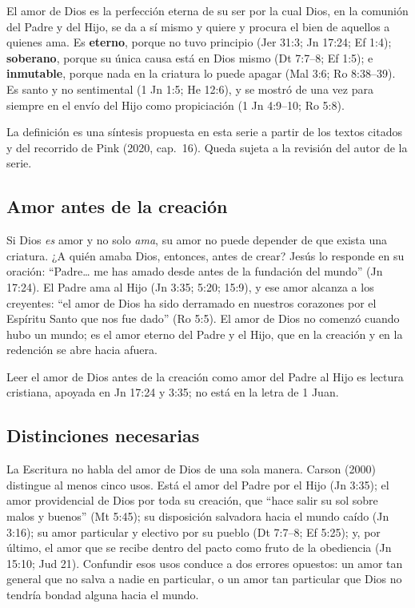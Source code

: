 \documentclass[11pt,letterpaper]{article}
\begin{document}
\begin{tcolorbox}[enhanced,colback=papiro,colframe=azul,boxrule=1pt,arc=3pt,left=8pt,right=8pt]
El amor de Dios es la perfección eterna de su ser por la cual Dios, en la comunión del Padre y del Hijo, se da a sí mismo y quiere y procura el bien de aquellos a quienes ama. Es \textbf{eterno}, porque no tuvo principio (Jer 31:3; Jn 17:24; Ef 1:4); \textbf{soberano}, porque su única causa está en Dios mismo (Dt 7:7--8; Ef 1:5); e \textbf{inmutable}, porque nada en la criatura lo puede apagar (Mal 3:6; Ro 8:38--39). Es santo y no sentimental (1 Jn 1:5; He 12:6), y se mostró de una vez para siempre en el envío del Hijo como propiciación (1 Jn 4:9--10; Ro 5:8).
\end{tcolorbox}

\begin{nota}[Precisión]
La definición es una síntesis propuesta en esta serie a partir de los textos citados y del recorrido de Pink (2020, cap.~16). Queda sujeta a la revisión del autor de la serie.
\end{nota}

\subsection{Amor antes de la creación}
Si Dios \emph{es} amor y no solo \emph{ama}, su amor no puede depender de que exista una criatura. ¿A quién amaba Dios, entonces, antes de crear? Jesús lo responde en su oración: ``Padre\ldots{} me has amado desde antes de la fundación del mundo'' (Jn 17:24). El Padre ama al Hijo (Jn 3:35; 5:20; 15:9), y ese amor alcanza a los creyentes: ``el amor de Dios ha sido derramado en nuestros corazones por el Espíritu Santo que nos fue dado'' (Ro 5:5). El amor de Dios no comenzó cuando hubo un mundo; es el amor eterno del Padre y el Hijo, que en la creación y en la redención se abre hacia afuera.

\begin{nota}[Precisión]
Leer el amor de Dios antes de la creación como amor del Padre al Hijo es lectura cristiana, apoyada en Jn 17:24 y 3:35; no está en la letra de 1 Juan.
\end{nota}

\subsection{Distinciones necesarias}
La Escritura no habla del amor de Dios de una sola manera. Carson (2000) distingue al menos cinco usos. Está el amor del Padre por el Hijo (Jn 3:35); el amor providencial de Dios por toda su creación, que ``hace salir su sol sobre malos y buenos'' (Mt 5:45); su disposición salvadora hacia el mundo caído (Jn 3:16); su amor particular y electivo por su pueblo (Dt 7:7--8; Ef 5:25); y, por último, el amor que se recibe dentro del pacto como fruto de la obediencia (Jn 15:10; Jud 21). Confundir esos usos conduce a dos errores opuestos: un amor tan general que no salva a nadie en particular, o un amor tan particular que Dios no tendría bondad alguna hacia el mundo.
\end{document}
